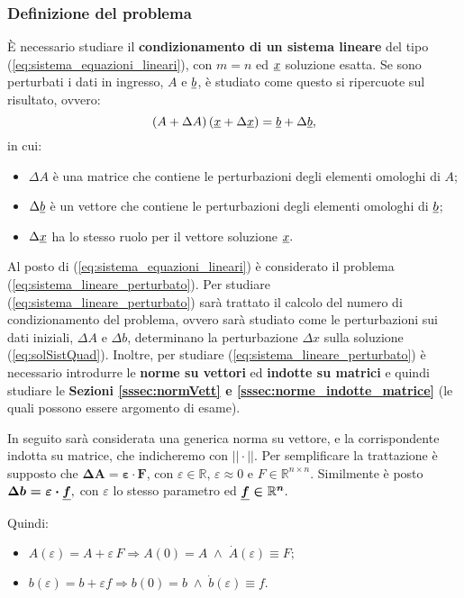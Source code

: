 \subsubsection{Definizione del problema}
È necessario studiare il \textbf{condizionamento di un sistema lineare} del tipo (\ref{eq:sistema_equazioni_lineari}), con $m=n$ ed $\uline x$ soluzione esatta. Se sono perturbati i dati in ingresso, $A$ e $\uline b$, è studiato come questo si ripercuote sul risultato, ovvero:
\begin{equation}\label{eq:sistema_lineare_perturbato}
    \left(A+\Delta A\right)\left(\uline x + \Delta\uline x\right) = \uline b +\Delta\uline b,
\end{equation}
in cui:
\begin{itemize}
    \item $\Delta A$ è una matrice che contiene le perturbazioni degli elementi omologhi di $A$;
    \item $\Delta\uline b$ è un vettore che contiene le perturbazioni degli elementi omologhi di $\uline b$;
    \item $\Delta\uline x$ ha lo stesso ruolo per il vettore soluzione $\uline x.$
\end{itemize}

Al posto di (\ref{eq:sistema_equazioni_lineari}) è considerato il problema (\ref{eq:sistema_lineare_perturbato}). Per studiare (\ref{eq:sistema_lineare_perturbato}) sarà trattato il calcolo del numero di condizionamento del problema, ovvero sarà studiato come le perturbazioni sui dati iniziali, $\Delta A$ e $\Delta b$, determinano la perturbazione $\Delta x$ sulla soluzione (\ref{eq:solSistQuad}). Inoltre, per studiare (\ref{eq:sistema_lineare_perturbato}) è necessario introdurre le \textbf{norme su vettori} ed \textbf{indotte su matrici} e quindi studiare le \textbf{Sezioni \ref{sssec:normVett} e \ref{sssec:norme_indotte_matrice}} (le quali possono essere argomento di esame).

In seguito sarà considerata una generica norma su vettore, e la corrispondente indotta su matrice, che indicheremo con $||\cdot||.$ Per semplificare la trattazione è supposto che $\boldsymbol{\Delta A=\varepsilon\cdot F}$, con $\varepsilon\in\mathbb R,\,\varepsilon\approx 0$ e $F\in\mathbb R^{n\times n}.$ Similmente è posto $\boldsymbol{\Delta b = \varepsilon\cdot\uline f},$ con $\varepsilon$ lo stesso parametro ed $\boldsymbol{\uline f\in\mathbb R^n}.$

Quindi:
\begin{itemize}
    \item $A(\varepsilon)=A+\varepsilon\, F \Rightarrow A(0)=A\;\wedge\; \dot A(\varepsilon)\equiv F;$
    \item  $b(\varepsilon)=b+\varepsilon f\Rightarrow b(0)=b\; \wedge\; \dot{b}(\varepsilon)\equiv f.$
\end{itemize}

